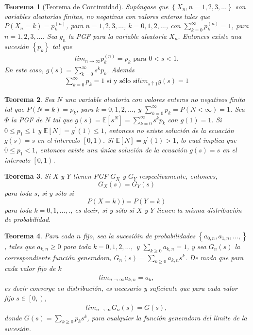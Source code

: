 \documentclass{article}
\newtheorem{Teo}{Teorema}
\newcommand{\esp}{\mathbb{E}}
\begin{document}
\begin{Teo}[Teorema de Continuidad]
Sup\'ongase que $\left\{X_{n},n=1,2,3,\ldots\right\}$ son variables aleatorias finitas, no negativas con valores enteros tales que $P\left(X_{n}=k\right)=p_{k}^{(n)}$, para $n=1,2,3,\ldots$, $k=0,1,2,\ldots$, con $\sum_{k=0}^{\infty}p_{k}^{(n)}=1$, para $n=1,2,3,\ldots$. Sea $g_{n}$ la PGF para la variable aleatoria $X_{n}$. Entonces existe una sucesi\'on $\left\{p_{k}\right\}$ tal que \begin{eqnarray*}
lim_{n\rightarrow\infty}p_{k}^{(n)}=p_{k}\textrm{ para }0<s<1.
\end{eqnarray*}
En este caso, $g\left(s\right)=\sum_{k=0}^{\infty}s^{k}p_{k}$. Adem\'as
\begin{eqnarray*}
\sum_{k=0}^{\infty}p_{k}=1\textrm{ si y s\'olo si
}lim_{s\uparrow1}g\left(s\right)=1
\end{eqnarray*}
\end{Teo}

\begin{Teo}
Sea $N$ una variable aleatoria con valores enteros no negativos finita tal que $P\left(N=k\right)=p_{k}$, para $k=0,1,2,\ldots$, y $\sum_{k=0}^{\infty}p_{k}=P\left(N<\infty\right)=1$. Sea $\Phi$ la PGF de $N$ tal que $g\left(s\right)=\esp\left[s^{N}\right]=\sum_{k=0}^{\infty}s^{k}p_{k}$ con $g\left(1\right)=1$. Si $0\leq p_{1}\leq1$ y $\esp\left[N\right]=g^{'}\left(1\right)\leq1$, entonces no existe soluci\'on  de la ecuaci\'on $g\left(s\right)=s$ en el intervalo $\left[0,1\right)$. Si $\esp\left[N\right]=g^{'}\left(1\right)>1$, lo cual implica que $0\leq p_{1}<1$, entonces existe una \'unica soluci\'on de la ecuaci\'on $g\left(s\right)=s$ en el intervalo
$\left[0,1\right)$.
\end{Teo}

\begin{Teo}
Si $X$ y $Y$ tienen PGF $G_{X}$ y $G_{Y}$ respectivamente, entonces,\[G_{X}\left(s\right)=G_{Y}\left(s\right)\] para toda $s$, si y s\'olo si \[P\left(X=k\right))=P\left(Y=k\right)\] para toda $k=0,1,\ldots,$., es decir, si y s\'olo si $X$ y $Y$ tienen la misma distribuci\'on de probabilidad.
\end{Teo}


\begin{Teo}
Para cada $n$ fijo, sea la sucesi\'oin de probabilidades $\left\{a_{0,n},a_{1,n},\ldots,\right\}$, tales que $a_{k,n}\geq0$ para toda $k=0,1,2,\ldots,$ y $\sum_{k\geq0}a_{k,n}=1$, y sea $G_{n}\left(s\right)$ la correspondiente funci\'on generadora, $G_{n}\left(s\right)=\sum_{k\geq0}a_{k,n}s^{k}$. De modo que para cada valor fijo de $k$
\begin{eqnarray*}
lim_{n\rightarrow\infty}a_{k,n}=a_{k},
\end{eqnarray*}
es decir converge en distribuci\'on, es necesario y suficiente que para cada valor fijo $s\in\left[0,\right)$,
\begin{eqnarray*}
lim_{n\rightarrow\infty}G_{n}\left(s\right)=G\left(s\right),
\end{eqnarray*}
donde $G\left(s\right)=\sum_{k\geq0}p_{k}s^{k}$, para cualquier la funci\'on generadora del l\'imite de la sucesi\'on.
\end{Teo}
\end{document}
